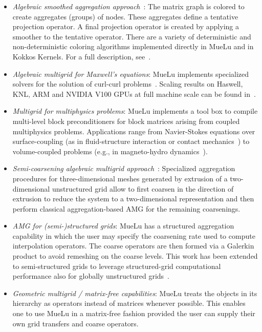 \begin{itemize}
	\item \emph{Algebraic smoothed aggregation approach}~\cite{Vanek1996a}:
	      The matrix graph is colored to create aggregates (groups) of nodes.
	      These aggregates define a tentative projection operator.
	      A final projection operator is created by applying a smoother to the tentative operator.
	      There are a variety of deterministic and non-deterministic coloring algorithms implemented directly
	      in MueLu and in Kokkos Kernels.  For a full description, see~\cite{BergerVergiat2023a}.

	\item \emph{Algebraic multigrid for Maxwell's equations}:
	      MueLu implements specialized solvers for the solution of curl-curl problems~\cite{BochevHuEtAl2008_AlgebraicMultigridApproachBased}.
	      Scaling results on Haswell, KNL, ARM and NVIDIA V100 GPUs at full machine scale can be found in~\cite{BettencourtBrownEtAl2021_EmpirePic}.

	\item \emph{Multigrid for multiphysics problems}:
	      MueLu implements a tool box to compile multi-level block preconditioners for block matrices arising from coupled multiphysics problems.
	      Applications range from Navier-Stokes equations
	      over surface-coupling (as in fluid\hyp{}structure interaction or contact mechanics~\cite{Wiesner2021a})
	      to volume-coupled problems (e.g., in magneto-hydro dynamics~\cite{Ohm2022a}).

	\item \emph{Semi-coarsening algebraic multigrid approach}~\cite{Tuminaro2016a}:
	      Specialized aggregation procedures for three-dimensional meshes generated by extrusion of a two-dimensional unstructured grid
	      allow to first coarsen in the direction of extrusion to reduce the system to a two-dimensional representation and then perform classical aggregation-based AMG
	      for the remaining coarsenings.

	\item \emph{AMG for (semi-)structured grids}:
	      MueLu has a structured aggregation capability in which the user may specify the coarsening rate used to compute interpolation operators.
	      The coarse operators are then formed via a Galerkin product to avoid remeshing on the coarse levels.
	      This work has been extended to semi-structured grids to leverage structured-grid computational performance also for globally unstructured grids~\cite{Mayr2022a}.

	\item \emph{Geometric multigrid / matrix-free capabilities}:
	      MueLu treats the objects in its hierarchy as operators instead of matrices whenever possible.
	      This enables one to use MueLu in a matrix-free fashion provided the user can supply their own grid transfers and coarse operators.
\end{itemize}

